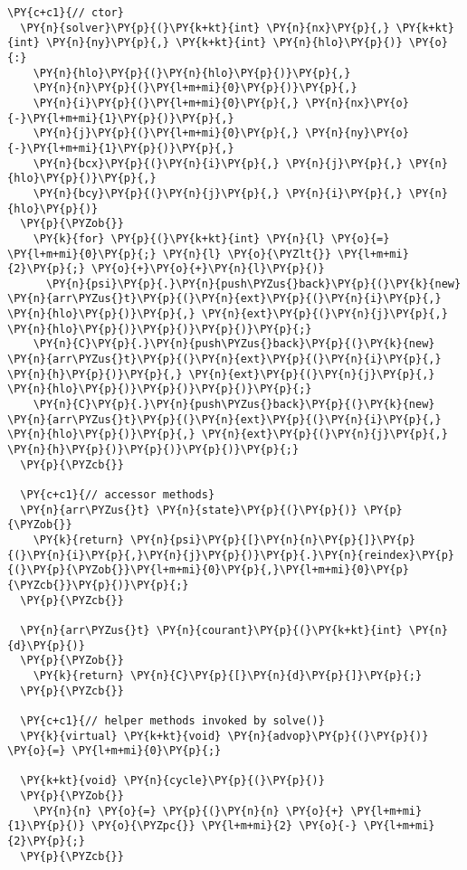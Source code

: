 \begin{Verbatim}[commandchars=\\\{\}]
  \PY{c+c1}{// ctor}
  \PY{n}{solver}\PY{p}{(}\PY{k+kt}{int} \PY{n}{nx}\PY{p}{,} \PY{k+kt}{int} \PY{n}{ny}\PY{p}{,} \PY{k+kt}{int} \PY{n}{hlo}\PY{p}{)} \PY{o}{:}
    \PY{n}{hlo}\PY{p}{(}\PY{n}{hlo}\PY{p}{)}\PY{p}{,}
    \PY{n}{n}\PY{p}{(}\PY{l+m+mi}{0}\PY{p}{)}\PY{p}{,} 
    \PY{n}{i}\PY{p}{(}\PY{l+m+mi}{0}\PY{p}{,} \PY{n}{nx}\PY{o}{-}\PY{l+m+mi}{1}\PY{p}{)}\PY{p}{,} 
    \PY{n}{j}\PY{p}{(}\PY{l+m+mi}{0}\PY{p}{,} \PY{n}{ny}\PY{o}{-}\PY{l+m+mi}{1}\PY{p}{)}\PY{p}{,}  
    \PY{n}{bcx}\PY{p}{(}\PY{n}{i}\PY{p}{,} \PY{n}{j}\PY{p}{,} \PY{n}{hlo}\PY{p}{)}\PY{p}{,} 
    \PY{n}{bcy}\PY{p}{(}\PY{n}{j}\PY{p}{,} \PY{n}{i}\PY{p}{,} \PY{n}{hlo}\PY{p}{)}
  \PY{p}{\PYZob{}}
    \PY{k}{for} \PY{p}{(}\PY{k+kt}{int} \PY{n}{l} \PY{o}{=} \PY{l+m+mi}{0}\PY{p}{;} \PY{n}{l} \PY{o}{\PYZlt{}} \PY{l+m+mi}{2}\PY{p}{;} \PY{o}{+}\PY{o}{+}\PY{n}{l}\PY{p}{)} 
      \PY{n}{psi}\PY{p}{.}\PY{n}{push\PYZus{}back}\PY{p}{(}\PY{k}{new} \PY{n}{arr\PYZus{}t}\PY{p}{(}\PY{n}{ext}\PY{p}{(}\PY{n}{i}\PY{p}{,} \PY{n}{hlo}\PY{p}{)}\PY{p}{,} \PY{n}{ext}\PY{p}{(}\PY{n}{j}\PY{p}{,} \PY{n}{hlo}\PY{p}{)}\PY{p}{)}\PY{p}{)}\PY{p}{;}
    \PY{n}{C}\PY{p}{.}\PY{n}{push\PYZus{}back}\PY{p}{(}\PY{k}{new} \PY{n}{arr\PYZus{}t}\PY{p}{(}\PY{n}{ext}\PY{p}{(}\PY{n}{i}\PY{p}{,} \PY{n}{h}\PY{p}{)}\PY{p}{,} \PY{n}{ext}\PY{p}{(}\PY{n}{j}\PY{p}{,} \PY{n}{hlo}\PY{p}{)}\PY{p}{)}\PY{p}{)}\PY{p}{;}
    \PY{n}{C}\PY{p}{.}\PY{n}{push\PYZus{}back}\PY{p}{(}\PY{k}{new} \PY{n}{arr\PYZus{}t}\PY{p}{(}\PY{n}{ext}\PY{p}{(}\PY{n}{i}\PY{p}{,} \PY{n}{hlo}\PY{p}{)}\PY{p}{,} \PY{n}{ext}\PY{p}{(}\PY{n}{j}\PY{p}{,} \PY{n}{h}\PY{p}{)}\PY{p}{)}\PY{p}{)}\PY{p}{;}
  \PY{p}{\PYZcb{}}

  \PY{c+c1}{// accessor methods}
  \PY{n}{arr\PYZus{}t} \PY{n}{state}\PY{p}{(}\PY{p}{)} \PY{p}{\PYZob{}}
    \PY{k}{return} \PY{n}{psi}\PY{p}{[}\PY{n}{n}\PY{p}{]}\PY{p}{(}\PY{n}{i}\PY{p}{,}\PY{n}{j}\PY{p}{)}\PY{p}{.}\PY{n}{reindex}\PY{p}{(}\PY{p}{\PYZob{}}\PY{l+m+mi}{0}\PY{p}{,}\PY{l+m+mi}{0}\PY{p}{\PYZcb{}}\PY{p}{)}\PY{p}{;}
  \PY{p}{\PYZcb{}}

  \PY{n}{arr\PYZus{}t} \PY{n}{courant}\PY{p}{(}\PY{k+kt}{int} \PY{n}{d}\PY{p}{)} 
  \PY{p}{\PYZob{}} 
    \PY{k}{return} \PY{n}{C}\PY{p}{[}\PY{n}{d}\PY{p}{]}\PY{p}{;} 
  \PY{p}{\PYZcb{}}

  \PY{c+c1}{// helper methods invoked by solve()}
  \PY{k}{virtual} \PY{k+kt}{void} \PY{n}{advop}\PY{p}{(}\PY{p}{)} \PY{o}{=} \PY{l+m+mi}{0}\PY{p}{;}

  \PY{k+kt}{void} \PY{n}{cycle}\PY{p}{(}\PY{p}{)} 
  \PY{p}{\PYZob{}} 
    \PY{n}{n} \PY{o}{=} \PY{p}{(}\PY{n}{n} \PY{o}{+} \PY{l+m+mi}{1}\PY{p}{)} \PY{o}{\PYZpc{}} \PY{l+m+mi}{2} \PY{o}{-} \PY{l+m+mi}{2}\PY{p}{;} 
  \PY{p}{\PYZcb{}}


\end{Verbatim}
